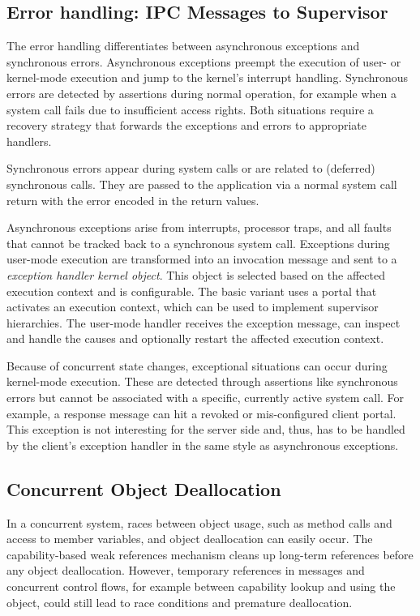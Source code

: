 \subsection{Error handling: IPC Messages to Supervisor}
\label{sec:error-dyn}

The error handling differentiates between asynchronous exceptions and synchronous errors. Asynchronous exceptions preempt the execution of user- or kernel-mode execution and jump to the kernel's interrupt handling. Synchronous errors are detected by assertions during normal operation, for example when a system call fails due to insufficient access rights.
Both situations require a recovery strategy that forwards the exceptions and errors to appropriate handlers.

Synchronous errors appear during system calls or are related to (deferred) synchronous calls. They are passed to the application via a normal system call return with the error encoded in the return values.

Asynchronous exceptions arise from interrupts, processor traps, and all faults that cannot be tracked back to a synchronous system call. Exceptions during user-mode execution are transformed into an invocation message and sent to a \emph{exception handler kernel object}. This object is selected based on the affected execution context and is configurable. The basic variant uses a portal that activates an execution context, which can be used to implement supervisor hierarchies. The user-mode handler receives the exception message, can inspect and handle the causes and optionally restart the affected execution context.

Because of concurrent state changes, exceptional situations can occur during kernel-mode execution. These are detected through assertions like synchronous errors but cannot be associated with a specific, currently active system call. For example, a response message can hit a revoked or mis-configured client portal. This exception is not interesting for the server side and, thus, has to be handled by the client's exception handler in the same style as asynchronous exceptions.

\subsection{Concurrent Object Deallocation}
\label{sec:async-deletion-dyn}

In a concurrent system, races between object usage, such as method calls and access to member variables, and object deallocation can easily occur.
The capability-based weak references mechanism cleans up long-term references before any object deallocation. However, temporary references in messages and concurrent control flows, for example between capability lookup and using the object, could still lead to race conditions and premature deallocation.

